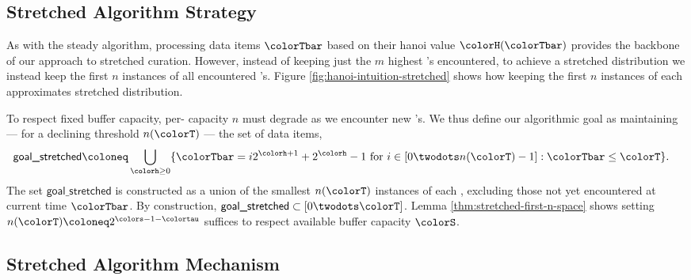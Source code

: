 
\subsection{Stretched Algorithm Strategy}
\label{sec:stretched-strategy}

As with the steady algorithm, processing data items $\colorTbar$ based on their hanoi value $\colorH(\colorTbar)$ provides the backbone of our approach to stretched curation.
However, instead of keeping just the $m$ highest \hv{}'s encountered, to achieve a stretched distribution we instead keep the first $n$ instances of all encountered \hv{}'s.
Figure \ref{fig:hanoi-intuition-stretched} shows how keeping the first $n$ instances of each \hv{} approximates stretched distribution.

To respect fixed buffer capacity, per-\hv{} capacity $n$ must degrade as we encounter new \hv{}'s.
We thus define our algorithmic goal as maintaining --- for a declining threshold $n(\colorT)$ --- the set of data items,
\begin{align*}
\textsf{goal\_stretched}
&\coloneq
\bigcup_{\colorh \geq 0}
\{ \colorTbar = i2^{\colorh + 1} + 2^{\colorh} - 1 \text{ for } i \in [0 \twodots n(\colorT) - 1] : \colorTbar \leq \colorT \}.
\end{align*}
The set $\textsf{goal\_stretched}$ is constructed as a union of the smallest $n(\colorT)$ instances of each \hv{}, excluding those not yet encountered at current time $\colorTbar$.
By construction, $\textsf{goal\_stretched} \subset [0 \twodots \colorT]$.
Lemma \ref{thm:stretched-first-n-space} shows setting $n(\colorT) \coloneq 2^{\colors - 1 - \colortau}$ suffices to respect available buffer capacity $\colorS$.


\FloatBarrier  %


\subsection{Stretched Algorithm Mechanism}
\label{sec:stretched-mechanism}

